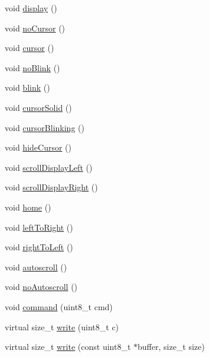 \begin{DoxyCompactItemize}
void \hyperlink{class_pololu_h_d44780_base_af5dd1e137bfe9310a418924b7483fcdf}{display} ()
\item 
void \hyperlink{class_pololu_h_d44780_base_ab40886cf0b563a1806bc9391d00b032d}{no\+Cursor} ()
\item 
void \hyperlink{class_pololu_h_d44780_base_a4fd53028d74561be579103d674aa8eab}{cursor} ()
\item 
void \hyperlink{class_pololu_h_d44780_base_a301afc921881052b166e11cd45ad9696}{no\+Blink} ()
\item 
void \hyperlink{class_pololu_h_d44780_base_ac6e255adf32d5c70c0163422b1ae8e0c}{blink} ()
\item 
void \hyperlink{class_pololu_h_d44780_base_a6a4d8e79beda9f7c81659a8e13c8c338}{cursor\+Solid} ()
\item 
void \hyperlink{class_pololu_h_d44780_base_a6a53a6cffbb77953b5a2c4ae49e288de}{cursor\+Blinking} ()
\item 
void \hyperlink{class_pololu_h_d44780_base_a1db083d254d251c479a577f29bcdcec8}{hide\+Cursor} ()
\item 
void \hyperlink{class_pololu_h_d44780_base_aada34a47663585f60b70e1d6f936f6d3}{scroll\+Display\+Left} ()
\item 
void \hyperlink{class_pololu_h_d44780_base_a411512707f303af75de3c5aea313bf48}{scroll\+Display\+Right} ()
\item 
void \hyperlink{class_pololu_h_d44780_base_ab2d24add3c6da0328055bceb38a6d42c}{home} ()
\item 
void \hyperlink{class_pololu_h_d44780_base_ada551bdb01681eb57bec325778eb38a6}{left\+To\+Right} ()
\item 
void \hyperlink{class_pololu_h_d44780_base_aa3f8d4ba18feb9aa0f0a2fef3c6c2b37}{right\+To\+Left} ()
\item 
void \hyperlink{class_pololu_h_d44780_base_ad5104d9651fd95704d1ae192073b0d61}{autoscroll} ()
\item 
void \hyperlink{class_pololu_h_d44780_base_aee80e23d270913dd2c353e7bd5408249}{no\+Autoscroll} ()
\item 
void \hyperlink{class_pololu_h_d44780_base_a449ad8d9ff7afb90667da0003a39af3b}{command} (uint8\+\_\+t cmd)
\item 
virtual size\+\_\+t \hyperlink{class_pololu_h_d44780_base_a1aad3b3ce5820dc910174b3c91a5d65e}{write} (uint8\+\_\+t c)
\item 
virtual size\+\_\+t \hyperlink{class_pololu_h_d44780_base_a965028ffd2313e9eaa968348effcab81}{write} (const uint8\+\_\+t $\ast$buffer, size\+\_\+t size)
\end{DoxyCompactItemize}


